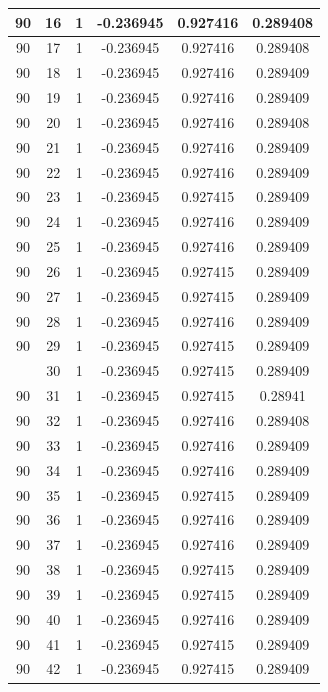 \documentclass[12pt,a4paper]{article}
\numberwithin{equation}{section}
\numberwithin{figure}{section}
\numberwithin{table}{section}
\begin{document}
\begin{longtable}{|c|c|c|c|c|c|}
90 & 16 & 1 & -0.236945 & 0.927416 & 0.289408 \\ \hline
90 & 17 & 1 & -0.236945 & 0.927416 & 0.289408 \\ \hline
90 & 18 & 1 & -0.236945 & 0.927416 & 0.289409 \\ \hline
90 & 19 & 1 & -0.236945 & 0.927416 & 0.289409 \\ \hline
90 & 20 & 1 & -0.236945 & 0.927416 & 0.289408 \\ \hline
90 & 21 & 1 & -0.236945 & 0.927416 & 0.289409 \\ \hline
90 & 22 & 1 & -0.236945 & 0.927416 & 0.289409 \\ \hline
90 & 23 & 1 & -0.236945 & 0.927415 & 0.289409 \\ \hline
90 & 24 & 1 & -0.236945 & 0.927416 & 0.289409 \\ \hline
90 & 25 & 1 & -0.236945 & 0.927416 & 0.289409 \\ \hline
90 & 26 & 1 & -0.236945 & 0.927415 & 0.289409 \\ \hline
90 & 27 & 1 & -0.236945 & 0.927415 & 0.289409 \\ \hline
90 & 28 & 1 & -0.236945 & 0.927416 & 0.289409 \\ \hline
90 & 29 & 1 & -0.236945 & 0.927415 & 0.289409 \\ \hline
\pagebreak
90 & 30 & 1 & -0.236945 & 0.927415 & 0.289409 \\ \hline
90 & 31 & 1 & -0.236945 & 0.927415 & 0.28941 \\ \hline
90 & 32 & 1 & -0.236945 & 0.927416 & 0.289408 \\ \hline
90 & 33 & 1 & -0.236945 & 0.927416 & 0.289409 \\ \hline
90 & 34 & 1 & -0.236945 & 0.927416 & 0.289409 \\ \hline
90 & 35 & 1 & -0.236945 & 0.927415 & 0.289409 \\ \hline
90 & 36 & 1 & -0.236945 & 0.927416 & 0.289409 \\ \hline
90 & 37 & 1 & -0.236945 & 0.927416 & 0.289409 \\ \hline
90 & 38 & 1 & -0.236945 & 0.927415 & 0.289409 \\ \hline
90 & 39 & 1 & -0.236945 & 0.927415 & 0.289409 \\ \hline
90 & 40 & 1 & -0.236945 & 0.927416 & 0.289409 \\ \hline
90 & 41 & 1 & -0.236945 & 0.927415 & 0.289409 \\ \hline
90 & 42 & 1 & -0.236945 & 0.927415 & 0.289409 \\ \hline

\end{longtable}
\end{document}
